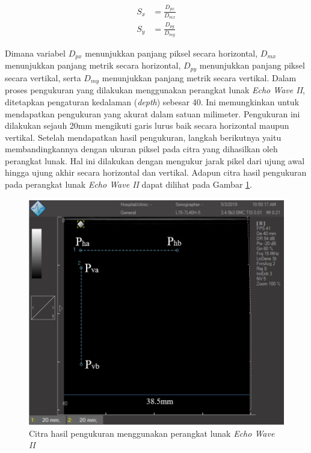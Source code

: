 \begin{equation}
	\begin{aligned}
		S_x &= \frac{D_{px}}{D_{mx}} \\[10pt]
		S_y &= \frac{D_{py}}{D_{my}}
	\end{aligned}
	\label{eq:persamaan_skala_citra}
\end{equation}

Dimana variabel $D_{px}$ menunjukkan panjang piksel secara horizontal, $D_{mx}$ menunjukkan panjang metrik secara horizontal, $D_{py}$ menunjukkan panjang piksel secara vertikal, serta $D_{my}$ menunjukkan panjang metrik secara vertikal. Dalam proses pengukuran yang dilakukan menggunakan perangkat lunak \textit{Echo Wave II}, ditetapkan pengaturan kedalaman (\textit{depth}) sebesar 40. Ini memungkinkan untuk mendapatkan pengukuran yang akurat dalam satuan milimeter. Pengukuran ini dilakukan sejauh 20mm mengikuti garis lurus baik secara horizontal maupun vertikal. Setelah mendapatkan hasil pengukuran, langkah berikutnya yaitu membandingkannya dengan ukuran piksel pada citra yang dihasilkan oleh perangkat lunak. Hal ini dilakukan dengan mengukur jarak pikel dari ujung awal hingga ujung akhir secara horizontal dan vertikal. Adapun citra hasil pengukuran pada perangkat lunak \textit{Echo Wave II} dapat dilihat pada Gambar \ref{fig:result_echo_wave}.


\begin{figure}[htbp]
	\centering
	\includegraphics[scale= 0.6]{bab2/hasil_echo_wave.png}
	\caption{Citra hasil pengukuran menggunakan perangkat lunak \textit{Echo Wave II}}
	\label{fig:result_echo_wave}
\end{figure}

